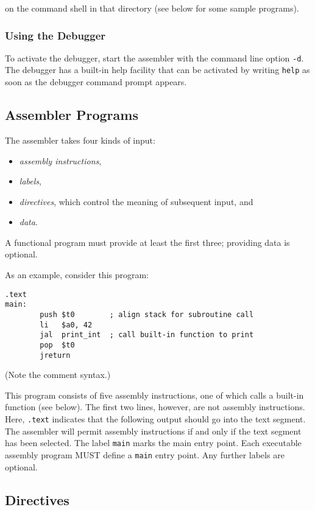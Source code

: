 \documentclass{article}
\begin{document}
on the command shell in that directory (see below for some sample programs).

\subsubsection{Using the Debugger}
To activate the debugger, start the assembler with the command line option \texttt{-d}.
The debugger has a built-in help facility that can be activated by writing \texttt{help} as
soon as the debugger command prompt appears.

\subsection{Assembler Programs}

The assembler takes four kinds of input:
\begin{itemize}
  \item \emph{assembly instructions},
  \item \emph{labels},
  \item \emph{directives}, which control the meaning of subsequent input, and
  \item \emph{data}.
\end{itemize}

A functional program must provide at least the first three; providing
data is optional.

As an example, consider this program:

\begin{lstlisting}
.text
main:
        push $t0        ; align stack for subroutine call
        li   $a0, 42
        jal  print_int  ; call built-in function to print
        pop  $t0
        jreturn
\end{lstlisting}
(Note the comment syntax.)

This program consists of five assembly instructions, one of which
calls a built-in function (see below).  The first two lines, however,
are not assembly instructions.  Here, \texttt{.text} indicates that
the following output should go into the text segment.  The assembler
will permit assembly instructions if and only if the text segment has
been selected.  The label \texttt{main} marks the main entry point.
Each executable assembly program MUST define a \texttt{main} entry
point.  Any further labels are optional.

\subsection{Directives}
\end{document}
